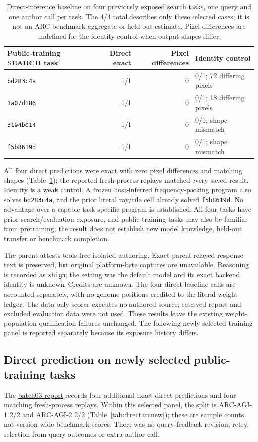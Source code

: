 \documentclass[11pt]{article}
\begin{document}
\begin{table}[!htbp]
\centering\small
\begin{tabular}{@{}lrrl@{}}
\toprule
Public-training SEARCH task & Direct exact & Pixel differences & Identity control\\
\midrule
\texttt{bd283c4a} & 1/1 & 0 & 0/1; 72 differing pixels\\
\texttt{1a07d186} & 1/1 & 0 & 0/1; 18 differing pixels\\
\texttt{3194b014} & 1/1 & 0 & 0/1; shape mismatch\\
\texttt{f5b8619d} & 1/1 & 0 & 0/1; shape mismatch\\
\bottomrule
\end{tabular}
\caption{Direct-inference baseline on four previously exposed search tasks, one query and
one author call per task. The 4/4 total describes only these selected cases; it is not an
ARC benchmark aggregate or held-out estimate. Pixel differences are undefined for the
identity control when output shapes differ.}
\label{tab:directarc}
\end{table}

All four direct predictions were exact with zero pixel differences and matching shapes
(Table~\ref{tab:directarc}); the reported fresh-process replays matched every saved result.
Identity is a weak control. A frozen host-inferred frequency-packing program also solves
\texttt{bd283c4a}, and the prior literal ray/tile cell already solved \texttt{f5b8619d}.
No advantage over a capable task-specific program is established. All four tasks have prior
search/evaluation exposure, and public-training tasks may also be familiar from pretraining;
the result does not establish new model knowledge, held-out transfer or benchmark completion.

The parent attests tools-free isolated authoring. Exact parent-relayed response text is
preserved, but original platform-byte captures are unavailable. Reasoning is recorded as
\texttt{xhigh}; the setting was the default model and its exact backend identity is unknown.
Credits are unknown. The four direct-baseline calls are accounted separately, with no genome
positions credited to the literal-weight ledger. The data-only scorer executes no authored
source; reserved report and excluded evaluation data were not used. These results leave the
existing weight-population qualification failures unchanged. The following newly selected
training panel is reported separately because its exposure history differs.

\subsection{Direct prediction on newly selected public-training tasks}\label{sec:directarcnew}
The \href{https://github.com/Sanokei/CellForge/blob/02beaf18251fca5ed1f1eb55e92f00a3e3820e88/reports/NATIVE_DIRECT_BATCH03_RESULT_20261006.md}{batch03 report} records
four additional exact direct predictions and four matching fresh-process replays. Within
this selected panel, the split is ARC-AGI-1 2/2 and ARC-AGI-2 2/2
(Table~\ref{tab:directarcnew}); these are sample counts, not version-wide benchmark scores.
There was no query-feedback revision, retry, selection from query outcomes or extra author call.
\end{document}
